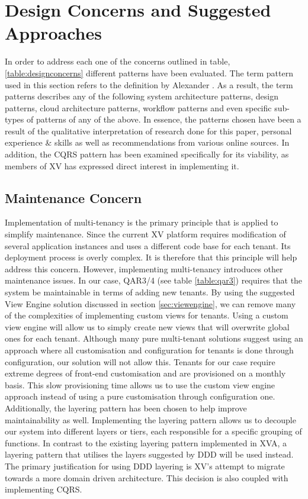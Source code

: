 \section{Design Concerns and Suggested Approaches}
In order to address each one of the concerns outlined in table, \ref{table:designconcerns} different patterns have been evaluated. The term pattern used in this section refers to the definition by Alexander \cite{Alexander1977-ni}. As a result, the term patterns describes any of the following system architecture patterns, design patterns, cloud architecture patterns, workflow patterns and even specific sub-types of patterns of any of the above. In essence, the patterns chosen have been a result of the qualitative interpretation of research done for this paper, personal experience \& skills as well as recommendations from various online sources. In addition, the CQRS pattern has been examined specifically for its viability, as members of XV has expressed direct interest in implementing it. 

\subsection{Maintenance Concern}
Implementation of multi-tenancy is the primary principle that is applied to simplify maintenance. Since the current XV platform requires modification of several application instances and uses a different code base for each tenant. Its deployment process is overly complex. It is therefore that this principle will help address this concern. However, implementing multi-tenancy introduces other maintenance issues. In our case, QAR3/4 (see table \ref{table:qar3}) requires that the system be maintainable in terms of adding new tenants. By using the suggested View Engine solution  discussed in section \ref{sec:viewengine}, we can remove many of the complexities of implementing custom views for tenants. Using a custom view engine will allow us to simply create new views that will overwrite global ones for each tenant. Although many pure multi-tenant solutions suggest using an approach where all customisation and configuration for tenants is done through configuration, our solution will not allow this. Tenants for our case require extreme degrees of front-end customisation and are provisioned on a monthly basis. This slow provisioning time allows us to use the custom view engine approach instead of using a pure customisation through configuration one. Additionally, the layering pattern has been chosen to help improve maintainability as well. Implementing the layering pattern allows us to decouple our system into different layers or tiers, each responsible for a specific grouping of functions. In contrast to the existing layering pattern implemented in XVA, a layering pattern that utilises the layers suggested by DDD will be used instead. The primary justification for using DDD layering is XV's attempt to migrate towards a more domain driven architecture. This decision is also coupled with implementing CQRS.


